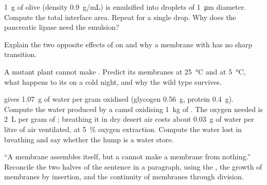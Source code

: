 \begin{exercise}[$\star\star$]\label{exo:b1:lipids:8}
\qty{1}{g} of olive  (density \qty{0.9}{g/mL}) is emulsified into
droplets of \qty{1}{\micro m} diameter. Compute the total interface
area. Repeat for a single drop. Why does the pancreatic lipase need the
emulsion?
\end{exercise}

\begin{exercise}[$\star\star$]\label{exo:b1:lipids:9}
Explain the two opposite effects of  on 
and why a membrane with  has no sharp transition.
\end{exercise}

\begin{exercise}[$\star\star\star$]\label{exo:b1:lipids:10}
A mutant plant cannot make . Predict its
membranes at \qty{25}{\celsius} and at \qty{5}{\celsius}, what happens
to its  on a cold night, and why the wild type survives.
\end{exercise}

\begin{exercise}[$\star\star\star$]\label{exo:b1:lipids:11}
 gives \qty{1.07}{g} of water per gram oxidised (glycogen
\qty{0.56}{g}, protein \qty{0.4}{g}). Compute the water produced by a
camel oxidising \qty{1}{kg} of . The oxygen needed is
\qty{2}{L} per gram of ; breathing it in dry desert air costs about
\qty{0.03}{g} of water per litre of air ventilated, at \qty{5}{\%}
oxygen extraction. Compute the water lost in breathing and say whether
the hump is a water store.
\end{exercise}

\begin{exercise}[$\star\star\star$]\label{exo:b1:lipids:12}
``A membrane assembles itself, but a  cannot make a membrane from
nothing.'' Reconcile the two halves of the sentence in a paragraph,
using the , the growth of membranes by insertion, and
the continuity of membranes through  division.
\end{exercise}

